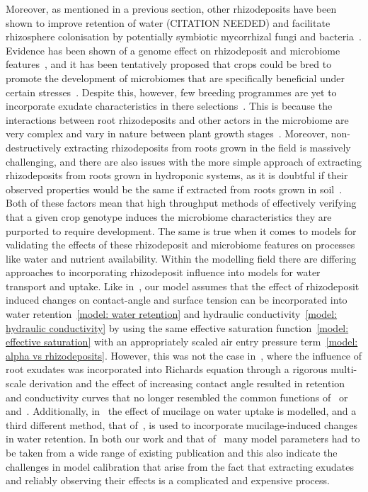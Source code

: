 \documentclass[11pt,a4paper]{article}
\numberwithin{equation}{section}
\begin{document}
Moreover, as mentioned in a previous section, other rhizodeposits have been shown to improve retention of water (CITATION NEEDED) and facilitate rhizosphere colonisation by potentially symbiotic mycorrhizal fungi and bacteria~\cite{iannucci2021relationships}. Evidence has been shown of a genome effect on rhizodeposit and microbiome features~\citep{iannucci2021relationships}, and it has been tentatively proposed that crops could be bred to promote the development of microbiomes that are specifically beneficial under certain stresses~\cite{ober2021wheat}. Despite this, however, few breeding programmes are yet to incorporate exudate characteristics in there selections~\citep{preece2020return}. This is because the interactions between root rhizodeposits and other actors in the microbiome are very complex and vary in nature between plant growth stages~\citep{bakker2012harnessing,oburger2018sampling}. Moreover, non-destructively extracting rhizodeposits from roots grown in the field is massively challenging, and there are also issues with the more simple approach of extracting rhizodeposits from roots grown in hydroponic systems, as it is doubtful if their observed properties would be the same if extracted from roots grown in soil~\citep{oburger2018sampling}. Both of these factors mean that high throughput methods of effectively verifying that a given crop genotype induces the microbiome characteristics they are purported to require development. The same is true when it comes to models for validating the effects of these rhizodeposit and microbiome features on processes like water and nutrient availability. Within the modelling field there are differing approaches to incorporating rhizodeposit influence into models for water transport and uptake. Like in~\citep{vogel1996hydrus, karagunduz2001influence}, our model assumes that the effect of rhizodeposit induced changes on contact-angle and surface tension can be incorporated into water retention~\eqref{model: water retention} and hydraulic conductivity~\eqref{model: hydraulic conductivity} by using the same effective saturation function~\eqref{model: effective saturation} with an appropriately scaled air entry pressure term~\eqref{model: alpha vs rhizodeposits}. However, this was not the case in~\citep{cooper2017fluid, cooper2018effect}, where the influence of root exudates was incorporated into Richards equation through a rigorous multi-scale derivation and the effect of increasing contact angle resulted in retention and conductivity curves that no longer resembled the common functions of~\cite{brooks1964hydrau} or~\cite{mualem1976new} and~\cite{van1980closed}. Additionally, in~\citep{landl2021modeling} the effect of mucilage on water uptake is modelled, and a third different method, that of~\cite{kroener2014nonequilibrium}, is used to incorporate mucilage-induced changes in water retention. In both our work and that of~\cite{landl2021modeling} many model parameters had to be taken from a wide range of existing publication and this also indicate the challenges in model calibration that arise from the fact that extracting exudates and reliably observing their effects is a complicated and expensive process. 
\end{document}
